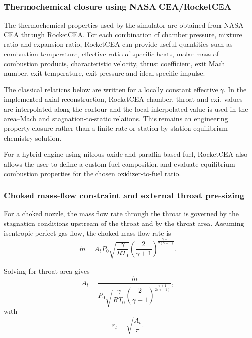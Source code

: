 \subsubsection{Thermochemical closure using NASA CEA/RocketCEA}

The thermochemical properties used by the simulator are obtained from NASA CEA through RocketCEA. For each combination of chamber pressure, mixture ratio and expansion ratio, RocketCEA can provide useful quantities such as combustion temperature, effective ratio of specific heats, molar mass of combustion products, characteristic velocity, thrust coefficient, exit Mach number, exit temperature, exit pressure and ideal specific impulse.

The classical relations below are written for a locally constant effective $\gamma$. In the implemented axial reconstruction, RocketCEA chamber, throat and exit values are interpolated along the contour and the local interpolated value is used in the area--Mach and stagnation-to-static relations. This remains an engineering property closure rather than a finite-rate or station-by-station equilibrium chemistry solution.

For a hybrid engine using nitrous oxide and paraffin-based fuel, RocketCEA also allows the user to define a custom fuel composition and evaluate equilibrium combustion properties for the chosen oxidizer-to-fuel ratio.

\subsubsection{Choked mass-flow constraint and external throat pre-sizing}

For a choked nozzle, the mass flow rate through the throat is governed by the stagnation conditions upstream of the throat and by the throat area. Assuming isentropic perfect-gas flow, the choked mass flow rate is
\begin{equation}
\dot{m}=A_t P_0
\sqrt{\frac{\gamma}{R T_0}}
\left(\frac{2}{\gamma+1}\right)^{\frac{\gamma+1}{2(\gamma-1)}} .
\label{eq:choked_mdot}
\end{equation}

Solving for throat area gives
\begin{equation}
A_t =
\frac{\dot{m}}{P_0
\sqrt{\dfrac{\gamma}{R T_0}}
\left(\dfrac{2}{\gamma+1}\right)^{\frac{\gamma+1}{2(\gamma-1)}}} ,
\label{eq:throat_area}
\end{equation}
with
\begin{equation}
r_t=\sqrt{\frac{A_t}{\pi}} .
\label{eq:throat_radius}
\end{equation}

